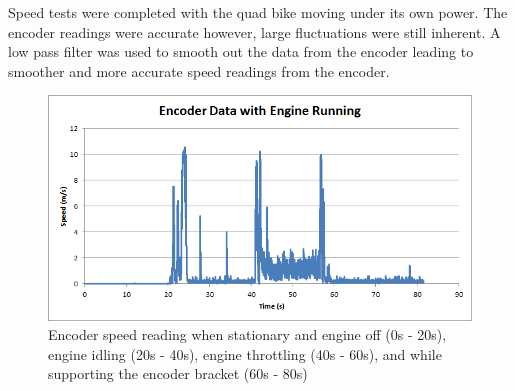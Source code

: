 \documentclass[main.tex]{subfiles}
\begin{document}
Speed tests were completed with the quad bike moving under its own power. The encoder readings were accurate however, large fluctuations were still inherent. A low pass filter was used to smooth out the data from the encoder leading to smoother and more accurate speed readings from the encoder. 
\begin{figure}[ht]
\includegraphics[width=1\textwidth]{5-Testing/Encoder_data_with_engine_running.png}
\centering
\caption[Encoder speed reading for various engine states]{Encoder speed reading when stationary and engine off (0s - 20s), engine idling (20s - 40s), engine throttling (40s - 60s), and while supporting the encoder bracket (60s - 80s)}
\end{figure}
\end{document}

